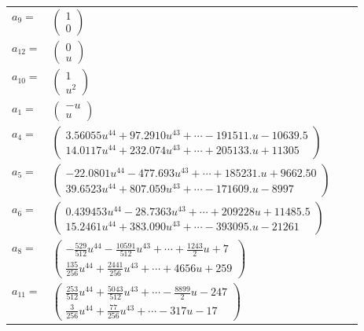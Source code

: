 \documentclass[1p]{elsarticle_modified}
\theoremstyle{definition}
\begin{document}
\begin{tabular}{m{7pt} m{180pt} m{7pt} m{180pt} }
\flushright $a_{9}=$&$\begin{pmatrix}1\\0\end{pmatrix}$ \\
\flushright $a_{12}=$&$\begin{pmatrix}0\\u\end{pmatrix}$ \\
\flushright $a_{10}=$&$\begin{pmatrix}1\\u^2\end{pmatrix}$ \\
\flushright $a_{1}=$&$\begin{pmatrix}- u\\u\end{pmatrix}$ \\
\flushright $a_{4}=$&$\begin{pmatrix}3.56055 u^{44}+97.2910 u^{43}+\cdots-191511. u-10639.5\\14.0117 u^{44}+232.074 u^{43}+\cdots+205133. u+11305\end{pmatrix}$ \\
\flushright $a_{5}=$&$\begin{pmatrix}-22.0801 u^{44}-477.693 u^{43}+\cdots+185231. u+9662.50\\39.6523 u^{44}+807.059 u^{43}+\cdots-171609. u-8997\end{pmatrix}$ \\
\flushright $a_{6}=$&$\begin{pmatrix}0.439453 u^{44}-28.7363 u^{43}+\cdots+209228 u+11485.5\\15.2461 u^{44}+383.090 u^{43}+\cdots-393095. u-21261\end{pmatrix}$ \\
\flushright $a_{8}=$&$\begin{pmatrix}-\frac{529}{512} u^{44}-\frac{10591}{512} u^{43}+\cdots+\frac{1243}{2} u+7\\\frac{135}{256} u^{44}+\frac{2441}{256} u^{43}+\cdots+4656 u+259\end{pmatrix}$ \\
\flushright $a_{11}=$&$\begin{pmatrix}\frac{253}{512} u^{44}+\frac{5043}{512} u^{43}+\cdots-\frac{8899}{2} u-247\\\frac{3}{256} u^{44}+\frac{77}{256} u^{43}+\cdots-317 u-17\end{pmatrix}$ \\

\end{tabular}
\end{document}
